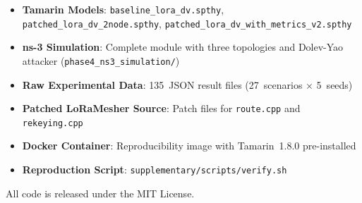 \documentclass[journal]{IEEEtran}
\begin{document}
\begin{itemize}
  \item \textbf{Tamarin Models}:
    \texttt{baseline\_lora\_dv.spthy},
    \texttt{patched\_lora\_dv\_2node.spthy},
    \texttt{patched\_lora\_dv\_with\_metrics\_v2.spthy}
  \item \textbf{ns-3 Simulation}: Complete module with three topologies
    and Dolev-Yao attacker
    (\texttt{phase4\_ns3\_simulation/})
  \item \textbf{Raw Experimental Data}: 135~JSON result files
    (27~scenarios × 5~seeds)
  \item \textbf{Patched LoRaMesher Source}: Patch files for
    \texttt{route.cpp} and \texttt{rekeying.cpp}
  \item \textbf{Docker Container}: Reproducibility image with
    Tamarin~1.8.0 pre-installed
  \item \textbf{Reproduction Script}: \texttt{supplementary/scripts/verify.sh}
\end{itemize}

All code is released under the MIT License.



\end{document}

